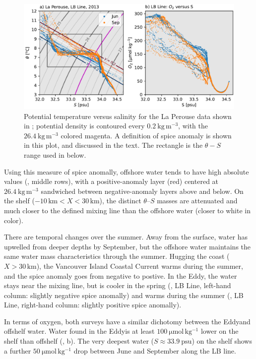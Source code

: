 \documentclass[draft]{agujournal2019}
\newcommand*{\Eddy}{{\sc Eddy}}
\begin{document}
\begin{figure}[htbp]
  \begin{center}
     \includegraphics[width=5in]{LaPerouse2013TS}
     \caption{Potential temperature versus salinity for the La Perouse data shown in ; potential density is contoured every $0.2\ \mathrm{kg\,m^{-3}}$, with the $26.4\ \mathrm{kg\,m^{-3}}$ colored magenta. A definition of spice anomaly is shown in this plot, and discussed in the text.  The rectangle is the $\theta-S$ range used in  below.}
     \label{fig:LaPerouse2013TS}
  \end{center}
\end{figure}

Using this measure of spice anomally, offshore water tends to have high absolute values (, middle rows), with a positive-anomaly layer (red) centered at $26.4\ \mathrm{kg\,m^{-3}}$ sandwiched between negative-anomaly layers above and below.  On the shelf ($-10\, \mathrm{km} < X < 30\, \mathrm{km}$), the distinct $\theta$--$S$ masses are attenuated and much closer to the defined mixing line than the offshore water (closer to white in color).

There are temporal changes over the summer.  Away from the surface, water has upwelled from deeper depths by September, but the offshore water maintains the same water mass characteristics through the summer.  Hugging the coast ($X > 30\, \mathrm{km}$), the Vancouver Island Coastal Current warms during the summer, and the spice anomaly goes from negative to postive.  In the \Eddy, the water stays near the mixing line, but is cooler in the spring (, LB Line, left-hand column: slightly negative spice anomally) and warms during the summer (, LB Line, right-hand column: slightly positive spice anomally).

In terms of oxygen, both surveys have a similar dichotomy between the \Eddy and offshelf water.  Water found in the \Eddy is at least $100\ \mathrm{\mu mol\, kg^{-1}}$ lower on the shelf than offshelf (, b).  The very deepest water ($S\approx 33.9\ \mathrm{psu}$) on the shelf shows a further $50\ \mathrm{\mu mol\, kg^{-1}}$ drop between June and September along the LB line.
\end{document}

